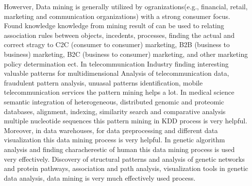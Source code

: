 Howerver, Data mining is generally utilized by ogranizations(e.g., financial, retail, marketing and communication organizations) with a strong consumer focus. Found knowledge knowledge from mining result of can be used to relating association rules between objects, incedents, processes, finding the actual and correct stragy to C2C (consumer to consumer) marketing, B2B (business to business) marketing, B2C (business to consumer) marketing, and other marketing policy determination ect. In telecommunication Industry finding interesting valuable patterns for multidimensional Analysis of telecommunication data, fraudulent pattern analysis, unuasal patterns identification, mobile telecommunication services the pattern mining helps a lot. In medical science semantic integration of heterogeneous, distributed genomic and proteomic databases, alignment, indexing, similarity search and comparative analysis multiple nucleotide sequences this pattern mining in KDD process is very helpful. Moreover, in data warehouses, for data preprocessing and different data visualization this data mining process is very helpful. In genetic algorithm analysis and finding characherestic of human this data mining process is used very effectively. Discovery of structural patterns and analysis of genetic networks and protein pathways, association and path analysis, visualization tools in genetic data analysis, data mining is very much effectively used process.


